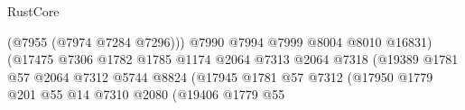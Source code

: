 \begin{lexlean}{RustCore}
\begin{coremodule}
                                                                (@7955 (@7974 @7284 @7296)))
                                                              @7990
                                                              @7994
                                                              @7999
                                                              @8004
                                                              @8010
                                                              @16831)
                                                            (@17475
                                                              @7306
                                                              @1782
                                                              @1785
                                                              @1174
                                                              @2064
                                                              @7313
                                                              @2064
                                                              @7318
                                                              (@19389
                                                                @1781
                                                                @57
                                                                @2064
                                                                @7312
                                                                @5744
                                                                @8824
                                                                (@17945
                                                                  @1781
                                                                  @57
                                                                  @7312
                                                                  (@17950
                                                                    @1779
                                                                    @201
                                                                    @55
                                                                    @14
                                                                    @7310
                                                                    @2080
                                                                    (@19406
                                                                      @1779
                                                                      @55

\end{coremodule}
\end{lexlean}
